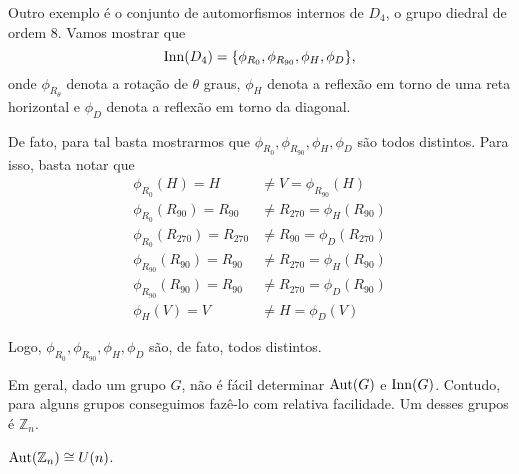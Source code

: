 	\begin{example}
	Outro exemplo é o conjunto de automorfismos
	internos de $D_4$, o grupo diedral de ordem $8$. Vamos mostrar que
	\begin{equation*}
        \operatorname{Inn}(D_4) =
        \displaystyle{
        \left\{
        \phi_{R_0},\phi_{R_{90}},\phi_{H},\phi_{D}
        \right\}},
	\end{equation*}
	onde $\phi_{R_{\theta}}$ denota a rotação de $\theta$ graus, $\phi_H$ denota
	a reflexão em torno de uma reta horizontal e $\phi_D$ denota a reflexão em torno
	da diagonal.
	\par\vspace{0.3cm} De fato, para tal basta mostrarmos que 
	$\phi_{R_0}, \phi_{R_{90}}, \phi_{H}, \phi_{D}$ são todos distintos.
	Para isso, basta notar que
	\begin{align*}
        \phi_{R_{0}}(H) = H &\neq V = \phi_{R_{90}}(H) \\
        \phi_{R_{0}}(R_{90}) = R_{90} &\neq R_{270} = \phi_{H}(R_{90}) \\
        \phi_{R_{0}}(R_{270}) = R_{270} &\neq R_{90} = \phi_{D}(R_{270}) \\
        \phi_{R_{90}}(R_{90}) = R_{90} &\neq R_{270} = \phi_{H}(R_{90}) \\
        \phi_{R_{90}}(R_{90}) = R_{90} &\neq R_{270} = \phi_{D}(R_{90}) \\
        \phi_{H}(V) = V &\neq H = \phi_{D}(V)
	\end{align*}
	\par\vspace{0.3cm} Logo, $\phi_{R_0}, \phi_{R_{90}}, \phi_{H}, \phi_{D}$
	são, de fato, todos distintos.
	\end{example}
	\par\vspace{0.3cm} Em geral, dado um grupo $G$, não é fácil determinar
	$\operatorname{Aut}(G)$ e $\operatorname{Inn}(G)$. Contudo, para alguns grupos conseguimos fazê-lo 
	com relativa facilidade. Um desses grupos é $\mathbb{Z}_n$.
	\begin{theorem}
	\label{automorfismos de Z_n}
		$\operatorname{Aut}(\mathbb{Z}_n) \cong U(n)$.
	\end{theorem}
